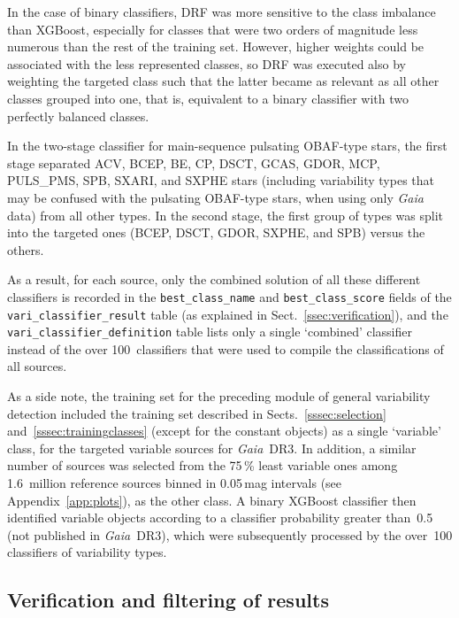 \documentclass[longauth]{aa}
\def\gaia{\textit{Gaia}\xspace}
\def\gdr3{\textit{Gaia}~DR3\xspace}
\begin{document}
In the case of binary classifiers, DRF was more sensitive to the class imbalance than XGBoost, especially for classes that were two orders of magnitude less numerous than the rest of the training set. However, higher weights could be associated with the less represented classes, so DRF was executed also by weighting the targeted class such that the latter became as relevant as all other classes grouped into one, that is, equivalent to a binary classifier with two perfectly balanced classes.

In the two-stage classifier for main-sequence pulsating OBAF-type stars, the first stage separated 
ACV, BCEP, BE, CP, DSCT, GCAS, GDOR, MCP, PULS\_PMS, SPB, SXARI, and SXPHE stars (including variability types that may be confused with the pulsating OBAF-type stars, when using only \gaia data) from all other types. In the second stage, the first group of types was split into the targeted ones (BCEP, DSCT, GDOR, SXPHE, and SPB) versus the others.

As a result, for each source, only the combined solution of all these different classifiers is recorded in the \texttt{best\_class\_name} and \texttt{best\_class\_score} fields of the \texttt{vari\_classifier\_result} table (as explained in Sect.~\ref{ssec:verification}), and the \texttt{vari\_classifier\_definition} table lists only a single `combined’ classifier instead of the over 100~classifiers that were used to compile the classifications of all sources.

As a side note, the training set for the preceding module of general variability detection \citep[see sect.~10.2.3 of the \gdr3 documentation;][]{2022gdr3.reptE..10R} included the training set described in Sects.~\ref{sssec:selection} and~\ref{sssec:trainingclasses} (except for the constant objects) as a single `variable' class, for the targeted variable sources for \gdr3. In addition, a similar number of sources was selected from the 75\,\% least variable ones among 1.6~million reference sources binned in 0.05\,mag intervals (see Appendix~\ref{app:plots}), as the other class. A binary XGBoost classifier then identified variable objects according to a classifier probability greater than~0.5 (not published in \gdr3), which were subsequently processed by the over~100 classifiers of variability types.



\subsection{Verification and filtering of results\label{ssec:verification}}
\end{document}
